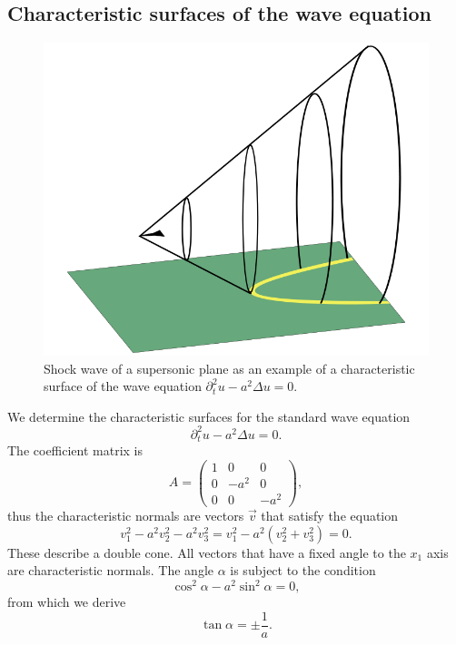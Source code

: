 \subsection{Characteristic surfaces of the wave equation}
\begin{figure}
\begin{center}
\includegraphics[width=0.8\hsize]{../common/graphics/shock}
\end{center}
\caption{Shock wave of a supersonic plane as an example of a characteristic
surface of the wave equation
$\partial_t^2u-a^2\Delta u=0$.\label{ueberschallkegel}}
\end{figure}
We determine the characteristic surfaces for the standard wave equation
\[
\partial_t^2u-a^2\Delta u=0.
\]
The coefficient matrix is
\[
A=\begin{pmatrix}
1&0&0\\
0&-a^2&0\\
0&0&-a^2
\end{pmatrix},
\]
thus the characteristic normals are vectors $\vec{v}$ that satisfy
the equation
\[
v_1^2-a^2v_2^2-a^2v_3^2
=
v_1^2 - a^2 (v_2^2+v_3^2)
=
0.
\]
These describe a double cone.
All vectors that have a fixed angle to the $x_1$ axis are characteristic
normals.
The angle $\alpha$ is subject to the condition
\[
\cos^2\alpha-a^2\sin^2\alpha=0,
\]
from which we derive
\[
\tan\alpha=\pm\frac1a.
\]

